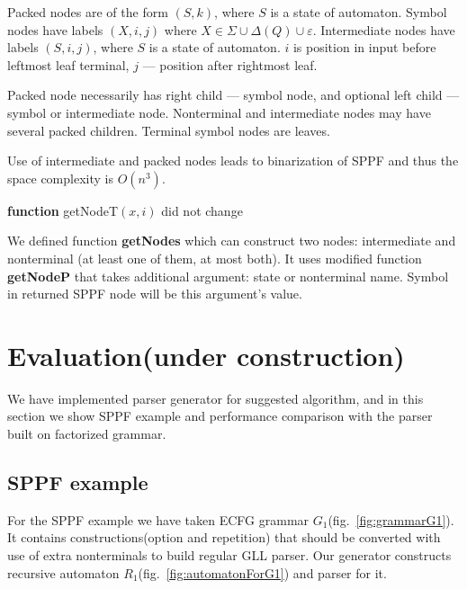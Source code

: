\documentclass[runningheads,a4paper]{llncs}
\begin{document}
Packed nodes are of the form $(S, k)$, where $S$ is a state of automaton. 
Symbol nodes have labels $(X, i, j)$ where $X \in \Sigma \cup \Delta(Q) \cup \varepsilon$. 
Intermediate nodes have labels $ (S, i, j) $, where $S$ is a state of automaton. $i$ is position in input before leftmost leaf terminal, $j$ --- position after rightmost leaf.

Packed node necessarily has right child --- symbol node, and optional left child --- symbol or intermediate node.
Nonterminal and intermediate nodes may have several packed children. 
Terminal symbol nodes are leaves.

Use of intermediate and packed nodes leads to binarization of SPPF and thus the space complexity is $O(n^{3})$.



\textbf{function} getNodeT$(x,i)$ did not change

We defined function \textbf{getNodes} which can construct two nodes: intermediate and nonterminal (at least one of them, at most both).
It uses modified function \textbf{getNodeP} that takes additional argument: state or nonterminal name. Symbol in returned SPPF node will be this argument's value.



\section{Evaluation(under construction)}

We have implemented parser generator for suggested algorithm, and
in this section we show SPPF example and performance comparison 
with the parser built on factorized grammar.

\subsection{SPPF example}

For the SPPF example we have taken ECFG grammar $G_1$(fig.~\ref{fig:grammarG1}).
It contains constructions(option and repetition) that should be converted with
use of extra nonterminals to build regular GLL parser. Our generator constructs
recursive automaton $R_1$(fig.~\ref{fig:automatonForG1}) and parser for it.
\end{document}
